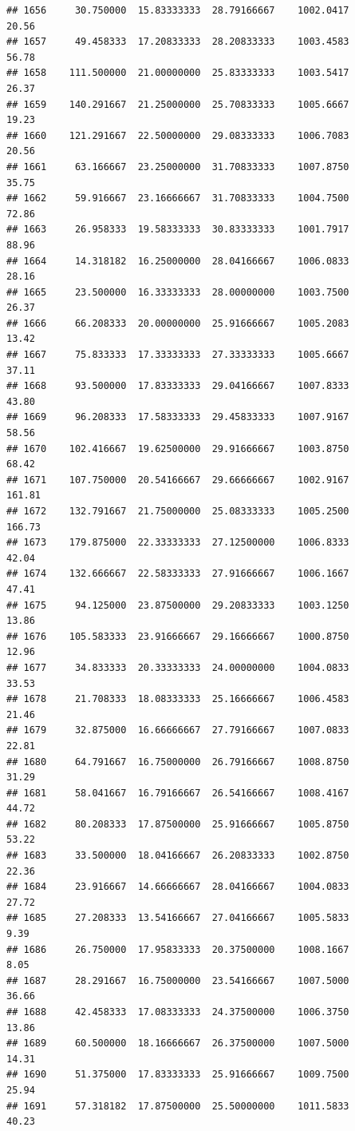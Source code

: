 \documentclass[
]{article}
\begin{document}
\begin{verbatim}
## 1656     30.750000  15.83333333  28.79166667    1002.0417       20.56
## 1657     49.458333  17.20833333  28.20833333    1003.4583       56.78
## 1658    111.500000  21.00000000  25.83333333    1003.5417       26.37
## 1659    140.291667  21.25000000  25.70833333    1005.6667       19.23
## 1660    121.291667  22.50000000  29.08333333    1006.7083       20.56
## 1661     63.166667  23.25000000  31.70833333    1007.8750       35.75
## 1662     59.916667  23.16666667  31.70833333    1004.7500       72.86
## 1663     26.958333  19.58333333  30.83333333    1001.7917       88.96
## 1664     14.318182  16.25000000  28.04166667    1006.0833       28.16
## 1665     23.500000  16.33333333  28.00000000    1003.7500       26.37
## 1666     66.208333  20.00000000  25.91666667    1005.2083       13.42
## 1667     75.833333  17.33333333  27.33333333    1005.6667       37.11
## 1668     93.500000  17.83333333  29.04166667    1007.8333       43.80
## 1669     96.208333  17.58333333  29.45833333    1007.9167       58.56
## 1670    102.416667  19.62500000  29.91666667    1003.8750       68.42
## 1671    107.750000  20.54166667  29.66666667    1002.9167      161.81
## 1672    132.791667  21.75000000  25.08333333    1005.2500      166.73
## 1673    179.875000  22.33333333  27.12500000    1006.8333       42.04
## 1674    132.666667  22.58333333  27.91666667    1006.1667       47.41
## 1675     94.125000  23.87500000  29.20833333    1003.1250       13.86
## 1676    105.583333  23.91666667  29.16666667    1000.8750       12.96
## 1677     34.833333  20.33333333  24.00000000    1004.0833       33.53
## 1678     21.708333  18.08333333  25.16666667    1006.4583       21.46
## 1679     32.875000  16.66666667  27.79166667    1007.0833       22.81
## 1680     64.791667  16.75000000  26.79166667    1008.8750       31.29
## 1681     58.041667  16.79166667  26.54166667    1008.4167       44.72
## 1682     80.208333  17.87500000  25.91666667    1005.8750       53.22
## 1683     33.500000  18.04166667  26.20833333    1002.8750       22.36
## 1684     23.916667  14.66666667  28.04166667    1004.0833       27.72
## 1685     27.208333  13.54166667  27.04166667    1005.5833        9.39
## 1686     26.750000  17.95833333  20.37500000    1008.1667        8.05
## 1687     28.291667  16.75000000  23.54166667    1007.5000       36.66
## 1688     42.458333  17.08333333  24.37500000    1006.3750       13.86
## 1689     60.500000  18.16666667  26.37500000    1007.5000       14.31
## 1690     51.375000  17.83333333  25.91666667    1009.7500       25.94
## 1691     57.318182  17.87500000  25.50000000    1011.5833       40.23

\end{verbatim}
\end{document}
